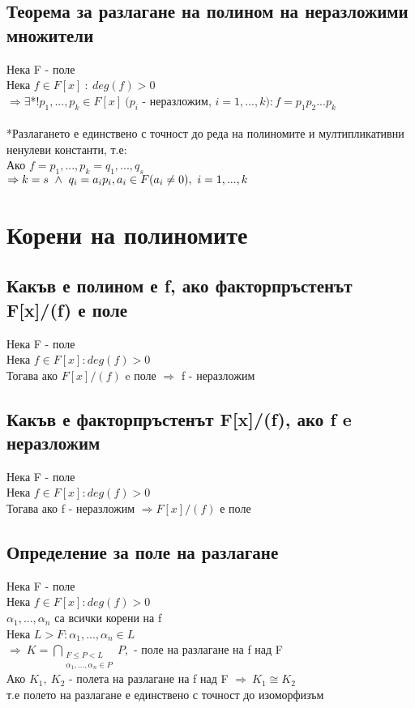 \documentclass[12pt]{article}
\begin{document}
\subsection{Теорема за разлагане на полином на неразложими множители}
Нека F - поле \\
Нека $f \in F[x]\ :\ deg(f) > 0$ \\
$\Rightarrow \exists $*$! p_1,...,p_k \in F[x] \ (p_i$ - неразложим, $i = 1,...,k) : f = p_1p_2...p_k$ \\ \\
*Разлагането е единствено с точност до реда на полиномите и мултипликативни ненулеви константи, т.е: \\
Ако $f = p_1,...,p_k = q_1,...,q_s$ \\
$\Rightarrow k = s \ \land \ q_i=a_ip_i,\\
 a_i \in F (a_i \neq 0),\ i=1,...,k$ \\

\section{Корени на полиномите}

\subsection{Какъв е полином е f, ако факторпръстенът F[x]/(f) е поле}
Нека F - поле \\
Нека $f \in F[x] : deg(f) > 0$ \\
Тогава ако $F[x]/(f)$ e поле $ \Rightarrow$ f - неразложим

\subsection{Какъв е факторпръстенът F[x]/(f), ако f e неразложим}
Нека F - поле \\
Нека $f \in F[x] : deg(f) > 0$ \\
Тогава ако f - неразложим $\Rightarrow F[x]/(f)$ е поле 

\subsection{Определение за поле на разлагане}
Нека F - поле\\
Нека $f \in F[x] : deg(f) > 0$\\
$\alpha_1,...,\alpha_n$ са всички корени на f\\
Нека $L > F : \alpha_1,...,\alpha_n \in L$ \\
$\Rightarrow\ K = \bigcap\limits_{\substack{F \leq P<L \\ \alpha_1,...,\alpha_n \in P}} P,  $ - поле на разлагане на f над F\\
Ако $K_1,\ K_2$ - полета на разлагане на f над F $\Rightarrow\ K_1 \cong K_2$\\
т.е полето на разлагане е единствено с точност до изоморфизъм
\end{document}
